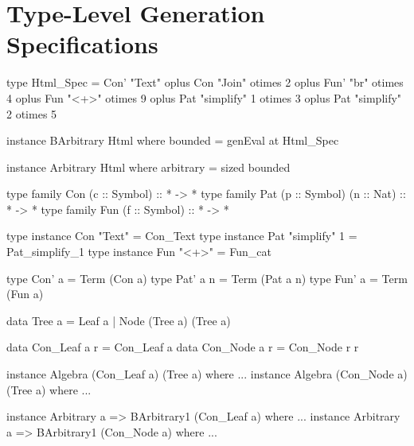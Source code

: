 \section{Type-Level Generation Specifications}
\label{sec:typelevel}

\begin{code}
type Html_Spec
  =      Con'  "Text"
  oplus  Con   "Join"         otimes 2
  oplus  Fun'  "br"           otimes 4
  oplus  Fun   "<+>"          otimes 9
  oplus  Pat   "simplify"  1  otimes 3
  oplus  Pat   "simplify"  2  otimes 5
\end{code}

\begin{code}
instance BArbitrary Html where
  bounded = genEval at Html_Spec

instance Arbitrary Html where
  arbitrary = sized bounded
\end{code}

\begin{code}
type family Con (c :: Symbol)             :: * -> *
type family Pat (p :: Symbol) (n :: Nat)  :: * -> *
type family Fun (f :: Symbol)             :: * -> *
\end{code}

\begin{code}
type instance Con "Text"        = Con_Text
type instance Pat "simplify" 1  = Pat_simplify_1
type instance Fun "<+>"         = Fun_cat
\end{code}

\begin{code}
type Con' a    = Term  (Con a)
type Pat' a n  = Term  (Pat a n)
type Fun' a    = Term  (Fun a)
\end{code}

\begin{code}
data Tree a = Leaf a | Node (Tree a) (Tree a)
\end{code}

\begin{code}
data Con_Leaf a r = Con_Leaf a
data Con_Node a r = Con_Node r r
\end{code}

\begin{code}
instance Algebra (Con_Leaf a) (Tree a) where ...
instance Algebra (Con_Node a) (Tree a) where ...
\end{code}

\begin{code}
instance Arbitrary a => BArbitrary1 (Con_Leaf a) where ...
instance Arbitrary a => BArbitrary1 (Con_Node a) where ...
\end{code}


